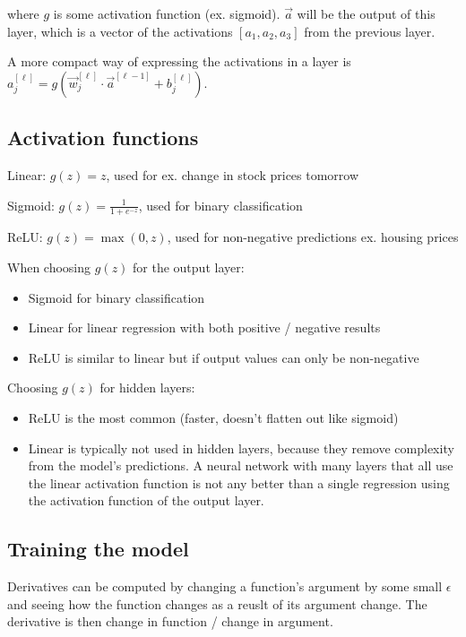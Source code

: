 \documentclass[12pt]{article}
\begin{document}
where $g$ is some activation function (ex. sigmoid). $\vec a$ will be the output of this
layer, which is a vector of the activations $[a_1,a_2,a_3]$ from the previous layer.

A more compact way of expressing the activations in a layer is $a^{[\ell]}_j =
g(\vec w^{[\ell]}_j \cdot \vec a^{[\ell-1]} + b^{[\ell]}_j)$.

\subsection{Activation functions}

Linear: $g(z) = z$, used for ex. change in stock prices tomorrow

Sigmoid: $g(z) = \frac{1}{1 + e^{-z}}$, used for binary classification

ReLU: $g(z) = \max(0, z)$, used for non-negative predictions ex. housing prices

When choosing $g(z)$ for the output layer:
\begin{itemize}
    \item Sigmoid for binary classification
    \item Linear for linear regression with both positive / negative results
    \item ReLU is similar to linear but if output values can only be non-negative
\end{itemize}

Choosing $g(z)$ for hidden layers:
\begin{itemize}
    \item ReLU is the most common (faster, doesn't flatten out like sigmoid)
    \item Linear is typically not used in hidden layers, because they remove complexity
        from the model's predictions. A neural network with many layers that all use
        the linear activation function is not any better than a single regression
        using the activation function of the output layer.
\end{itemize}

\subsection{Training the model}

Derivatives can be computed by changing a function's argument by some small $\epsilon$ and
seeing how the function changes as a reuslt of its argument change. The derivative is then
change in function / change in argument.
\end{document}
